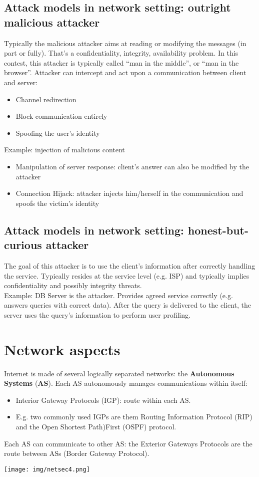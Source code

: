\documentclass[a4paper, 10pt, titlepage]{article}
\begin{document}
\subsection{Attack models in network setting: outright malicious attacker}
Typically the malicious attacker aims at reading or modifying the messages (in part or fully). That’s a confidentiality, integrity, availability problem. In this contest, this attacker is typically called “man in the middle”, or “man in the browser”. Attacker can intercept and act upon a communication between client and server:
\begin{itemize}
\item Channel redirection
\item Block communication entirely
\item Spoofing the user’s identity
\end{itemize}
Example: injection of malicious content
\begin{itemize}
\item Manipulation of server response: client’s answer can also be modified by the attacker
\item Connection Hijack: attacker injects him/herself in the communication and spoofs the victim’s identity
\end{itemize}

\subsection{Attack models in network setting: honest-but-curious attacker}
The goal of this attacker is to use the client’s information after correctly handling the service. Typically resides at the service level (e.g. ISP) and typically implies confidentiality and possibly integrity threats.\\
Example: DB Server is the attacker. Provides agreed service correctly (e.g. answers queries with correct data). After the query is delivered to the client, the server uses the query’s information to perform user profiling.

\newpage
\section{Network aspects}
Internet is made of several logically separated networks: the \textbf{Autonomous Systems} (\textbf{AS}). Each AS autonomously manages communications within itself:
\begin{itemize}
\item Interior Gateway Protocols (IGP): route within each AS. 
\item E.g. two commonly used IGPs are them Routing Information Protocol (RIP) and the Open Shortest Path)First (OSPF) protocol.
\end{itemize}
Each AS can communicate to other AS: the Exterior Gateways Protocols are the route between ASs (Border Gateway Protocol).
\begin{center}
	\texttt{[image: img/netsec4.png]}
\end{center}
\end{document}
